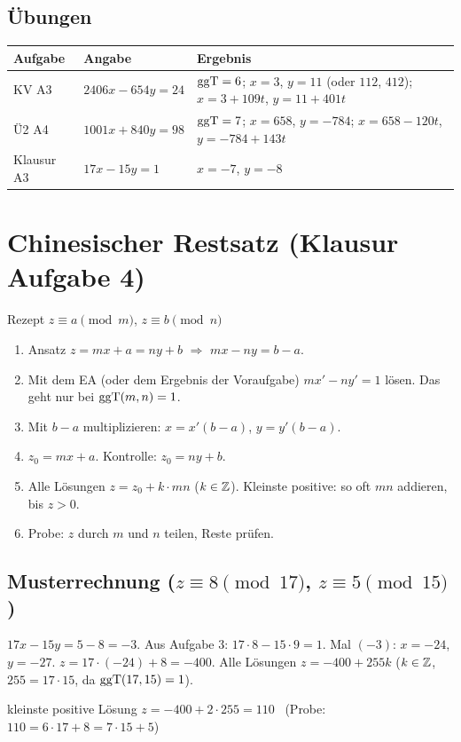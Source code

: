 \subsection*{Übungen}
\begin{tabular}{@{}lll@{}}
\toprule
Aufgabe & Angabe & Ergebnis\\
\midrule
KV A3 & $2406x - 654y = 24$ & $\operatorname{ggT} = 6$; $x = 3$, $y = 11$ (oder $112$, $412$); $x = 3 + 109t$, $y = 11 + 401t$\\
Ü2 A4 & $1001x + 840y = 98$ & $\operatorname{ggT} = 7$; $x = 658$, $y = -784$; $x = 658 - 120t$, $y = -784 + 143t$\\
Klausur A3 & $17x - 15y = 1$ & $x = -7$, $y = -8$\\
\bottomrule
\end{tabular}

\section{Chinesischer Restsatz (Klausur Aufgabe 4)}
\begin{rezept}{Rezept $z \equiv a \pmod m$, $z \equiv b \pmod n$}
\begin{enumerate}
\item Ansatz $z = m x + a = n y + b$ $\Rightarrow$ $m x - n y = b - a$.
\item Mit dem EA (oder dem Ergebnis der Voraufgabe) $m x' - n y' = 1$ lösen. Das geht nur bei $\operatorname{ggT}(m, n) = 1$.
\item Mit $b - a$ multiplizieren: $x = x'(b-a)$, $y = y'(b-a)$.
\item $z_0 = m x + a$. Kontrolle: $z_0 = n y + b$.
\item Alle Lösungen $z = z_0 + k \cdot m n$ ($k \in \mathbb{Z}$). Kleinste positive: so oft $mn$ addieren, bis $z > 0$.
\item Probe: $z$ durch $m$ und $n$ teilen, Reste prüfen.
\end{enumerate}
\end{rezept}

\subsection*{Musterrechnung ($z \equiv 8 \pmod{17}$, $z \equiv 5 \pmod{15}$)}
$17x - 15y = 5 - 8 = -3$. Aus Aufgabe 3: $17 \cdot 8 - 15 \cdot 9 = 1$. Mal $(-3)$: $x = -24$, $y = -27$.
$z = 17 \cdot (-24) + 8 = -400$. Alle Lösungen $z = -400 + 255k$ ($k \in \mathbb{Z}$, $255 = 17 \cdot 15$, da $\operatorname{ggT}(17, 15) = 1$).
\begin{ergebnis} kleinste positive Lösung $z = -400 + 2 \cdot 255 = 110$ \ (Probe: $110 = 6 \cdot 17 + 8 = 7 \cdot 15 + 5$) \end{ergebnis}

